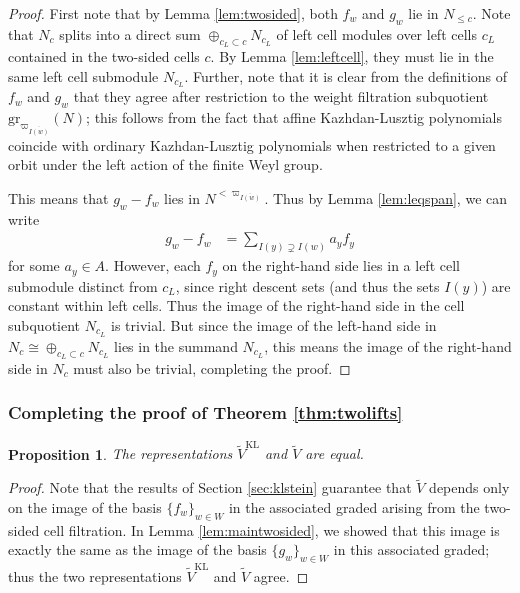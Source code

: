 \documentclass{amsart}
\newtheorem{prop}[thm]{Proposition}
\theoremstyle{definition}
\begin{document}
\begin{proof}
    First note that by Lemma \ref{lem:twosided}, both $f_w$ and $g_w$ lie in $N_{\leq c}$. Note that $N_c$ splits into a direct sum $\oplus_{c_L \subset c} N_{c_L}$ of left cell modules over left cells $c_L$ contained in the two-sided cells $c$. By Lemma \ref{lem:leftcell}, they must lie in the same left cell submodule $N_{c_L}$. Further, note that it is clear from the definitions of $f_w$ and $g_w$ that they agree after restriction to the weight filtration subquotient $\mathrm{gr}_{\varpi_{\overline{I(w)}}}(N)$; this follows from the fact that affine Kazhdan-Lusztig polynomials coincide with ordinary Kazhdan-Lusztig polynomials when restricted to a given orbit under the left action of the finite Weyl group. 

    This means that $g_w - f_w$ lies in $N^{<\varpi_{\overline{I(w)}}}$. Thus by Lemma \ref{lem:leqspan}, we can write
    \begin{align}
        g_w - f_w & = \sum_{I(y) \supsetneq I(w)} a_yf_y
    \end{align}
    for some $a_y \in A$. However, each $f_y$ on the right-hand side lies in a left cell submodule distinct from $c_L$, since right descent sets (and thus the sets $I(y)$) are constant within left cells. Thus the image of the right-hand side in the cell subquotient $N_{c_L}$ is trivial. But since the image of the left-hand side in $N_c \cong \oplus_{c_L \subset c} N_{c_L}$ lies in the summand $N_{c_L}$, this means the image of the right-hand side in $N_{c}$ must also be trivial, completing the proof. 
\end{proof}
\subsubsection{Completing the proof of Theorem \ref{thm:twolifts}}
\begin{prop}\label{prop:klandv}
    The representations $\tilde{V}^{\mathrm{KL}}$ and $\tilde{V}$ are equal. 
\end{prop}
\begin{proof}
    Note that the results of Section \ref{sec:klstein} guarantee that $\tilde{V}$ depends only on the image of the basis $\{f_w\}_{w \in W}$ in the associated graded arising from the two-sided cell filtration. In Lemma \ref{lem:maintwosided}, we showed that this image is exactly the same as the image of the basis $\{g_w\}_{w \in W}$ in this associated graded; thus the two representations $\tilde{V}^{\mathrm{KL}}$ and $\tilde{V}$ agree.
\end{proof}
\end{document}
